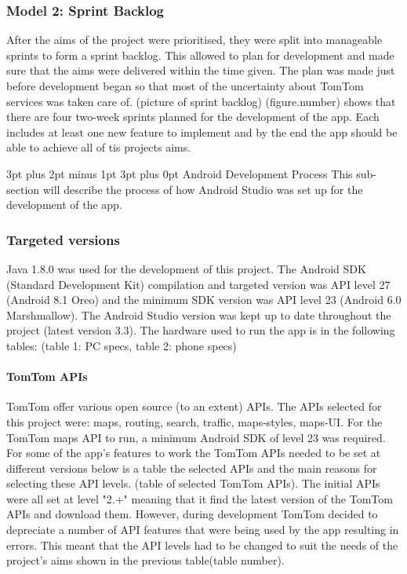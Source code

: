 \documentclass[12pt,a4paper]{article}
\makeatletter
\renewcommand\subsection{\@startsection {subsection}{1}{0mm} %
                               {3pt plus 2pt minus 1pt} %
                               {3pt plus 0pt} %
                               {\normalfont\bfseries}}
\makeatother
\begin{document}
\subsubsection{Model 2: Sprint Backlog}
After the aims of the project were prioritised, they were split into manageable sprints to form a sprint backlog. This allowed to plan for development and made sure that the aims were delivered within the time given. The plan was made just before development began so that most of the uncertainty about TomTom services was taken care of. (picture of sprint backlog)
(figure.number) shows that there are four two-week sprints planned for the development of the app. Each includes at least one new feature to implement and by the end the app should be able to achieve all of tis projects aims. 

\subsection{Android Development Process}
This sub-section will describe the process of how Android Studio was set up for the development of the app.
\subsubsection{Targeted versions}
Java 1.8.0 was used for the development of this project. The Android SDK (Standard Development Kit) compilation and targeted version was API level 27 (Android 8.1 Oreo) and the minimum SDK version was API level 23 (Android 6.0 Marshmallow). The Android Studio version was kept up to date throughout the project (latest version 3.3). The hardware used to run the app is in the following tables: (table 1: PC specs, table 2: phone specs)

\paragraph{TomTom APIs}
TomTom offer various open source (to an extent) APIs. The APIs selected for this project were: maps, routing, search, traffic, maps-styles, maps-UI. For the TomTom maps API to run, a minimum Android SDK of level 23 was required. For some of the app's features to work the TomTom APIs needed to be set at different versions below is a table the selected APIs and the main reasons for selecting these API levels. (table of selected TomTom APIs). The initial APIs were all set at level "2.+" meaning that it find the latest version of the TomTom APIs and download them. However, during development TomTom decided to depreciate a number of API features that were being used by the app resulting in errors. This meant that the API levels had to be changed to suit the needs of the project's aims shown in the previous table(table number).    
\end{document}
